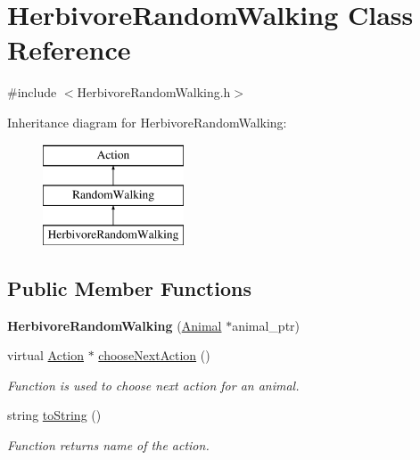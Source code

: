 \hypertarget{class_herbivore_random_walking}{}\section{Herbivore\+Random\+Walking Class Reference}
\label{class_herbivore_random_walking}


{\ttfamily \#include $<$Herbivore\+Random\+Walking.\+h$>$}

Inheritance diagram for Herbivore\+Random\+Walking\+:\begin{figure}[H]
\begin{center}
\leavevmode
\includegraphics[height=3.000000cm]{class_herbivore_random_walking}
\end{center}
\end{figure}
\subsection*{Public Member Functions}
\begin{DoxyCompactItemize}
\item 
\hypertarget{class_herbivore_random_walking_afefda07f0ba064504e2632e61e878688}{}{\bfseries Herbivore\+Random\+Walking} (\hyperlink{class_animal}{Animal} $\ast$animal\+\_\+ptr)\label{class_herbivore_random_walking_afefda07f0ba064504e2632e61e878688}

\item 
virtual \hyperlink{class_action}{Action} $\ast$ \hyperlink{class_herbivore_random_walking_aabb756e01d8d8a7f92ecaef6128a4a2c}{choose\+Next\+Action} ()
\begin{DoxyCompactList}\small\item\em Function is used to choose next action for an animal. \end{DoxyCompactList}\item 
string \hyperlink{class_herbivore_random_walking_a27a17f1ee3d5df3103f3348523c4801a}{to\+String} ()
\begin{DoxyCompactList}\small\item\em Function returns name of the action. \end{DoxyCompactList}\end{DoxyCompactItemize}
